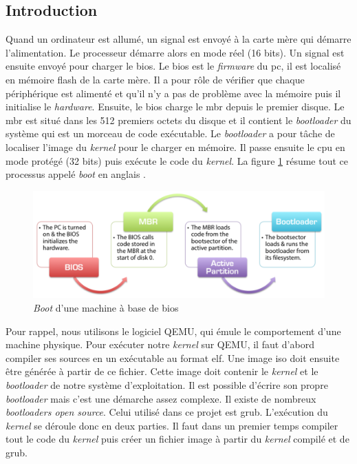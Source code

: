 \label{execution}

\subsection{Introduction}
Quand un ordinateur est allumé, un signal est envoyé à la carte mère qui démarre
l'alimentation. Le processeur démarre alors en mode réel (16 bits). Un signal
est ensuite envoyé pour charger le \acrshort{bios}. Le \acrshort{bios} est le
\textit{firmware} du \acrshort{pc}, il est localisé en mémoire flash de la carte
mère. Il a pour rôle de vérifier que chaque périphérique est alimenté et qu'il
n'y a pas de problème avec la mémoire puis il initialise le \textit{hardware}.
Ensuite, le \acrshort{bios} charge le \acrshort{mbr} depuis le premier disque.
Le \acrshort{mbr} est situé dans les 512 premiers octets du disque et il contient
le \textit{bootloader} du système qui est un morceau de code exécutable. Le
\textit{bootloader} a pour tâche de localiser l'image du \textit{kernel} pour le
charger en mémoire. Il passe ensuite le \acrshort{cpu} en mode protégé (32 bits) 
puis exécute le code du \textit{kernel}. La figure \ref{fig:exec:boot} résume tout
ce processus appelé \textit{boot} en anglais \cite{ref42}.

\begin{figure}[!h]
  \centering
  \includegraphics[scale=.45]{images/bios_boot.png}
  \caption{\textit{Boot} d'une machine à base de \acrshort{bios}}
  \label{fig:exec:boot}
\end{figure}

Pour rappel, nous utilisons le logiciel QEMU, qui émule le comportement d'une
machine physique. Pour exécuter notre \textit{kernel} sur QEMU, il faut d'abord
compiler ses sources en un exécutable au format \acrshort{elf}. Une image \acrshort{iso}
doit ensuite être générée à partir de ce fichier. Cette image doit contenir le
\textit{kernel} et le \textit{bootloader} de notre système d'exploitation.
Il est possible d'écrire son propre \textit{bootloader} mais c'est une démarche
assez complexe. Il existe de nombreux \textit{bootloaders open source}. Celui
utilisé dans ce projet est \acrshort{grub}. L'exécution du \textit{kernel} se
déroule donc en deux parties. Il faut dans un premier temps compiler tout le code
du \textit{kernel} puis créer un fichier image à partir du \textit{kernel}
compilé et de \acrshort{grub}.

